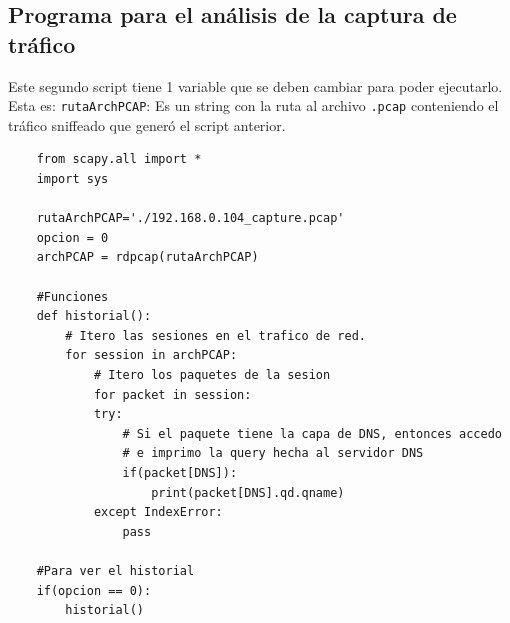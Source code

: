 \documentclass[a4paper, 13pt]{article}
\begin{document}
	\subsection{Programa para el análisis de la captura de tráfico}
	\par Este segundo script tiene 1 variable que se deben cambiar para poder ejecutarlo. Esta es: \verb|rutaArchPCAP|: Es un string con la ruta al archivo \verb|.pcap| conteniendo el tráfico sniffeado que generó el script anterior.
	\begin{lstlisting}
	from scapy.all import *
	import sys
	
	rutaArchPCAP='./192.168.0.104_capture.pcap'
	opcion = 0
	archPCAP = rdpcap(rutaArchPCAP)
	
	#Funciones
	def historial():
		# Itero las sesiones en el trafico de red.
		for session in archPCAP:
			# Itero los paquetes de la sesion
			for packet in session:
			try:
				# Si el paquete tiene la capa de DNS, entonces accedo 
				# e imprimo la query hecha al servidor DNS
				if(packet[DNS]):
					print(packet[DNS].qd.qname)
			except IndexError:
				pass
	
	#Para ver el historial
	if(opcion == 0):
		historial()
	\end{lstlisting}
	
	
\end{document}

